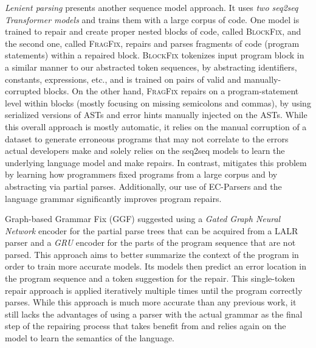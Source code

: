 \emph{Lenient parsing} \citep{Ahmed_2021} presents another sequence model
approach. It uses \emph{two seq2seq Transformer models} and trains them with a
large corpus of code. One model is trained to repair and create proper nested
blocks of code, called \textsc{BlockFix}, and the second one, called
\textsc{FragFix}, repairs and parses fragments of code (\eg program statements)
within a repaired block. \textsc{BlockFix} tokenizes input program block in a
similar manner to our abstracted token sequences, by abstracting identifiers,
constants, expressions, etc., and is trained on pairs of valid and
manually-corrupted blocks. On the other hand, \textsc{FragFix} repairs on a
program-statement level within blocks (mostly focusing on missing semicolons and
commas), by using serialized versions of ASTs and error hints manually injected
on the ASTs. While this overall approach is mostly automatic, it relies on the
manual corruption of a dataset to generate erroneous programs that may not
correlate to the errors actual developers make and solely relies on the seq2seq
models to learn the underlying language model and make repairs. In contrast,
\toolname mitigates this problem by learning how programmers fixed programs from
a large corpus and by abstracting via partial parses. Additionally, our use of
EC-Parsers and the language grammar significantly improves program repairs.

%
Graph-based Grammar Fix (\textsc{GGF}) \citep{Wu2020} suggested using a
\emph{Gated Graph Neural Network} encoder for the partial parse trees that can
be acquired from a LALR parser and a \emph{GRU} encoder for the parts of the
program sequence that are not parsed. This approach aims to better summarize the
context of the program in order to train more accurate models. Its models then
predict an error location in the program sequence and a token suggestion for the
repair. This single-token repair approach is applied iteratively multiple times
until the program correctly parses. While this approach is much more accurate
than any previous work, it still lacks the advantages of using a parser with the
actual grammar as the final step of the repairing process that \toolname takes
benefit from and relies again on the model to learn the semantics of the
language.

